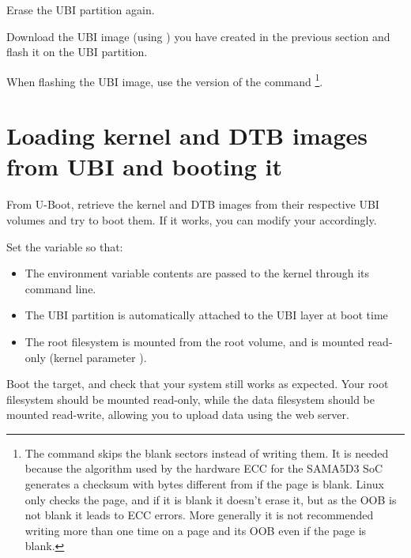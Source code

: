 Erase the UBI partition again.

Download the UBI image (using ) you have created in the
previous section and flash it on the UBI partition.

When flashing the UBI image, use the  version of the
command \footnote{The command  skips
  the blank sectors instead of writing them. It is needed because the
  algorithm used by the hardware ECC for the SAMA5D3 SoC generates a
  checksum with bytes different from  if the page is blank. Linux
  only checks the page, and if it is blank it doesn't erase it, but as
  the OOB is not blank it leads to ECC errors. More generally it is
  not recommended writing more than one time on a page and its OOB
  even if the page is blank.}.

\section{Loading kernel and DTB images from UBI and booting it}

From U-Boot, retrieve the kernel and DTB images from their respective
UBI volumes and try to boot them. If it works, you can modify your
 accordingly.

Set the  variable so that:

\begin{itemize}
\item The  environment variable contents are passed to
  the kernel through its command line.
\item The UBI partition is automatically attached to the UBI layer at
  boot time
\item The root filesystem is mounted from the root volume, and is mounted
  read-only (kernel parameter ).
\end{itemize}

Boot the target, and check that your system still works as
expected. Your root filesystem should be mounted read-only, while the
data filesystem should be mounted read-write, allowing you to upload
data using the web server.



